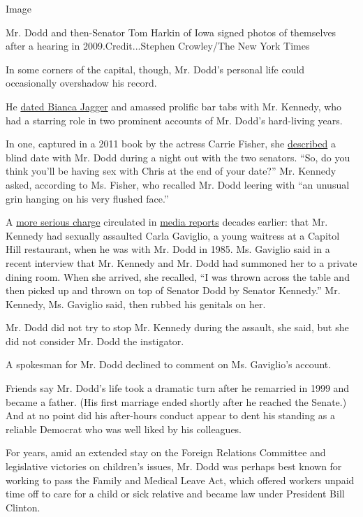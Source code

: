 Image

Mr. Dodd and then-Senator Tom Harkin of Iowa signed photos of themselves
after a hearing in 2009.Credit...Stephen Crowley/The New York Times

In some corners of the capital, though, Mr. Dodd's personal life could
occasionally overshadow his record.

He
\href{https://www.washingtonpost.com/archive/lifestyle/1983/07/13/christopher-dodd-his-fathers-son/a8fb2092-16c6-4b4a-923b-a534d980c7c7/}{dated
Bianca Jagger} and amassed prolific bar tabs with Mr. Kennedy, who had a
starring role in two prominent accounts of Mr. Dodd's hard-living years.

In one, captured in a 2011 book by the actress Carrie Fisher, she
\href{https://www.washingtonpost.com/blogs/reliable-source/post/carrie-fisher-on-her-blind-date-with-chris-dodd/2011/11/10/gIQAM94c9M_blog.html}{described}
a blind date with Mr. Dodd during a night out with the two senators.
``So, do you think you'll be having sex with Chris at the end of your
date?'' Mr. Kennedy asked, according to Ms. Fisher, who recalled Mr.
Dodd leering with ``an unusual grin hanging on his very flushed face.''

A \href{https://www.gq.com/story/kennedy-ted-senator-profile}{more
serious charge} circulated in
\href{https://www.gq.com/story/kennedy-ted-senator-profile}{media
reports} decades earlier: that Mr. Kennedy had sexually assaulted Carla
Gaviglio, a young waitress at a Capitol Hill restaurant, when he was
with Mr. Dodd in 1985. Ms. Gaviglio said in a recent interview that Mr.
Kennedy and Mr. Dodd had summoned her to a private dining room. When she
arrived, she recalled, ``I was thrown across the table and then picked
up and thrown on top of Senator Dodd by Senator Kennedy.'' Mr. Kennedy,
Ms. Gaviglio said, then rubbed his genitals on her.

Mr. Dodd did not try to stop Mr. Kennedy during the assault, she said,
but she did not consider Mr. Dodd the instigator.

A spokesman for Mr. Dodd declined to comment on Ms. Gaviglio's account.

Friends say Mr. Dodd's life took a dramatic turn after he remarried in
1999 and became a father. (His first marriage ended shortly after he
reached the Senate.) And at no point did his after-hours conduct appear
to dent his standing as a reliable Democrat who was well liked by his
colleagues.

For years, amid an extended stay on the Foreign Relations Committee and
legislative victories on children's issues, Mr. Dodd was perhaps best
known for working to pass the Family and Medical Leave Act, which
offered workers unpaid time off to care for a child or sick relative and
became law under President Bill Clinton.

